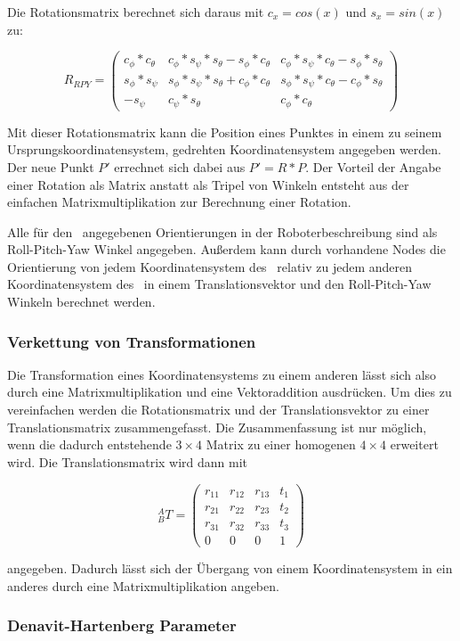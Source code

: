 Die Rotationsmatrix berechnet sich daraus mit $c_x=cos(x)$ und $s_x=sin(x)$ zu:

\begin{equation}
  R_{RPY}=
  \begin{pmatrix}
    c_\phi*c_\theta     
    & c_\phi*s_\psi*s_\theta-s_\phi*c_\theta
    & c_\phi*s_\psi*c_\theta-s_\phi*s_\theta\\

    s_\phi*s_\psi          
    & s_\phi*s_\psi*s_\theta+c_\phi*c_\theta
    & s_\phi*s_\psi*c_\theta-c_\phi*s_\theta\\
  
    -s_\psi    
    & c_\psi*s_\theta   
    & c_\phi*c_\theta
  
  \end{pmatrix}
\end{equation}
\cite{sciavicco2000modelling}

Mit dieser Rotationsmatrix kann die Position eines Punktes in einem zu seinem 
Ursprungskoordinatensystem, gedrehten Koordinatensystem angegeben werden. 
Der neue Punkt $P'$ errechnet sich dabei aus $P' = R * P$.
Der Vorteil der Angabe einer Rotation als Matrix anstatt als Tripel von Winkeln
entsteht aus der einfachen Matrixmultiplikation zur Berechnung einer Rotation.
\cite{craig2005}

Alle für den \cob\ angegebenen Orientierungen in der Roboterbeschreibung sind 
als Roll-Pitch-Yaw Winkel angegeben. Außerdem kann durch vorhandene Nodes 
die Orientierung von jedem Koordinatensystem des \cob\ relativ zu jedem 
anderen Koordinatensystem des \cob\ in einem Translationsvektor und den Roll-Pitch-Yaw
Winkeln berechnet werden.


\subsubsection{Verkettung von Transformationen}
\label{ssub:Verkettung von Transformationen}

Die Transformation eines Koordinatensystems zu einem anderen lässt sich also 
durch eine Matrixmultiplikation und eine Vektoraddition ausdrücken. 
Um dies zu vereinfachen werden die Rotationsmatrix und der Translationsvektor
zu einer Translationsmatrix zusammengefasst. Die Zusammenfassung ist nur 
möglich, wenn die dadurch entstehende $3\times4$ Matrix zu einer homogenen
$4\times4$ erweitert wird. Die Translationsmatrix wird dann mit 

\begin{equation}
  ^A_BT =\begin{pmatrix}
    r_{11}&r_{12}&r_{13}&t_1\\
    r_{21}&r_{22}&r_{23}&t_2\\
    r_{31}&r_{32}&r_{33}&t_3\\
    0&0&0&1
  \end{pmatrix}
\end{equation}

angegeben.
Dadurch lässt sich der Übergang von einem Koordinatensystem in ein anderes 
durch eine Matrixmultiplikation angeben.



\subsubsection{Denavit-Hartenberg Parameter}
\label{ssub:Denavit-Hartenberg Parameter}


